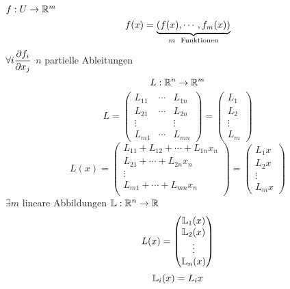 \begin{Bem}
  $f:U\rightarrow\mathbb{R}^m$
  \[f(x)=\underbrace{(f(x),\cdots,f_m(x))}_{m\hspace{2mm}\text{Funktionen}}\]
  $\forall i \dfrac{\partial f_i}{\partial x_j}$ $n$ partielle Ableitungen
  \[L:\mathbb{R}^n\rightarrow\mathbb{R}^m\]
  \[L = \begin{pmatrix}
    L_{11} & \cdots & L_{1n}\\
    L_{21} & \cdots & L_{2n}\\
    \vdots & & \vdots \\
    L_{m1} & \cdots & L_{mn}
  \end{pmatrix} = \begin{pmatrix}
    L_1 \\ L_2 \\ \vdots \\ L_m
  \end{pmatrix}\]
  \[L(x) = \begin{pmatrix}
    L_{11}+L_{12}+\cdots +L_{1n}x_n\\
    L_{21}+\cdots +L_{2n}x_n\\
    \vdots \\
    L_{m1}+\cdots +L_{mn}x_n\\
  \end{pmatrix} = \begin{pmatrix}
    L_1 x\\ L_2 x\\ \vdots \\ L_m x
  \end{pmatrix}\]
  $\exists m$ lineare Abbildungen $\mathbb{L}:\mathbb{R}^n\rightarrow\mathbb{R}$
  \[L(x)= \begin{pmatrix}
    \mathbb{L}_1(x)\\
    \mathbb{L}_2(x)\\
    \vdots \\
    \mathbb{L}_n(x)\\
  \end{pmatrix}\]
  \[\mathbb{L}_i(x)=L_i x\]
\end{Bem}
